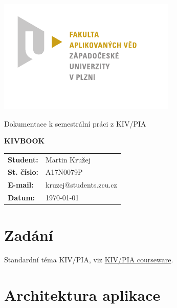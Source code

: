 \documentclass[
12pt,
a4paper,
pdftex,
czech,
titlepage
]{report}
\begin{document}
\begin{titlepage}
	\vspace*{-2cm}
	{\centering\includegraphics[scale=1.5]{FAV_logo.pdf}\par}
	\centering
	\vspace*{2cm}
	{\Large Dokumentace k semestrální práci z KIV/PIA\par}
	\vspace{1.0cm}
	{\Huge\bfseries KIVBOOK\par}
	\vspace{7cm}

	\begin{flushleft} 
	\begin{table}[ht]
	\label{stats}
	\begin{tabular}{ll}
	\textbf{Student:}  & Martin Kružej   \\
	\textbf{St. číslo:}   & A17N0079P    \\
	\textbf{E-mail:}  & kruzej@students.zcu.cz  \\
	\textbf{Datum:}    & \today            \\ 
	\end{tabular}
	\end{table}
	\end{flushleft}
	
	\vfill


\end{titlepage}

\tableofcontents
\thispagestyle{empty}
\clearpage

\chapter{Zadání}
\setcounter{page}{1}

Standardní téma KIV/PIA, viz \href{https://courseware.zcu.cz/portal/studium/courseware/kiv/pia/samostatna-prace/standardni-tema.html}{KIV/PIA courseware}.

\chapter{Architektura aplikace}
\end{document}

